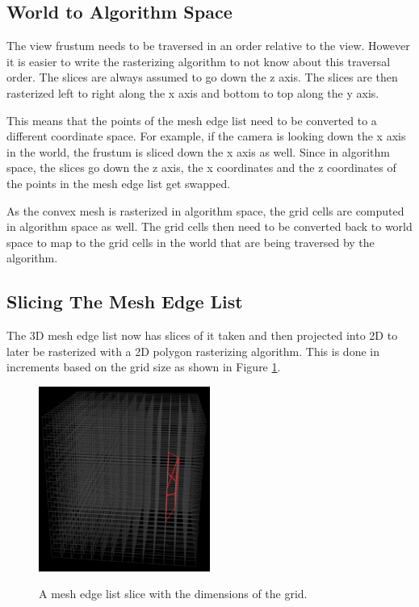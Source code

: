 \documentclass[12pt]{ucthesis}
\newcommand{\captionfonts}{\small\bf\ssp}
\begin{document}
\subsection{World to Algorithm Space}
\label{world-to-algorithm-space}

The view frustum needs to be traversed in an order relative to the view.
However it is easier to write the rasterizing algorithm to not know about this traversal order.
The slices are always assumed to go down the z axis.
The slices are then rasterized left to right along the x axis and bottom to top along the y axis.

This means that the points of the mesh edge list need to be converted to a different coordinate space.
For example, if the camera is looking down the x axis in the world, the frustum is sliced down the x axis as well.
Since in algorithm space, the slices go down the z axis, the x coordinates and the z coordinates of the points in the mesh edge list get swapped.

As the convex mesh is rasterized in algorithm space, the grid cells are computed in algorithm space as well.
The grid cells then need to be converted back to world space to map to the grid cells in the world that are being traversed by the algorithm.

\subsection{Slicing The Mesh Edge List}
\label{slicing-mesh-edge-list}

The 3D mesh edge list now has slices of it taken and then projected into 2D to later be rasterized with a 2D polygon rasterizing algorithm.
This is done in increments based on the grid size as shown in Figure \ref{fig:edge-list-slice}.

\begin{figure}
\begin{center}
\includegraphics[width=0.5\textwidth]{Images/RasterizingAlgorithm/Final/FrustSlice.png}
\captionfonts
\caption[Mesh Edge List Slice]{A mesh edge list slice with the dimensions of the grid.}
\label{fig:edge-list-slice}
\end{center}
\end{figure}
\end{document}
